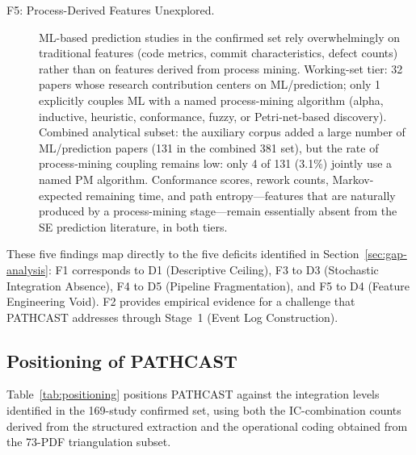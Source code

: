 \begin{description}
\item[F5: Process-Derived Features Unexplored.]
ML-based prediction studies in the confirmed set rely overwhelmingly on
traditional features (code metrics, commit characteristics, defect counts)
rather than on features derived from process mining. Working-set tier: 32
papers whose research contribution centers on ML/prediction; only 1
explicitly couples ML with a named process-mining algorithm (alpha,
inductive, heuristic, conformance, fuzzy, or Petri-net-based discovery).
Combined analytical subset: the auxiliary corpus added a large number of ML/prediction
papers (131 in the combined 381 set), but the rate of process-mining
coupling remains low: only 4 of 131 (3.1\%) jointly use a named PM
algorithm. Conformance scores, rework counts, Markov-expected remaining
time, and path entropy---features that are naturally produced by a
process-mining stage---remain essentially absent from the SE prediction
literature, in both tiers.

\end{description}

These five findings map directly to the five deficits identified in
Section~\ref{sec:gap-analysis}: F1 corresponds to D1 (Descriptive Ceiling),
F3 to D3 (Stochastic Integration Absence), F4 to D5 (Pipeline Fragmentation),
and F5 to D4 (Feature Engineering Void). F2 provides empirical evidence for a
challenge that PATHCAST addresses through Stage~1 (Event Log Construction).


\subsection{Positioning of PATHCAST}
\label{sec:slr-positioning}

Table~\ref{tab:positioning} positions PATHCAST against the integration levels
identified in the 169-study confirmed set, using both the IC-combination
counts derived from the structured extraction and the operational coding
obtained from the 73-PDF triangulation subset.

